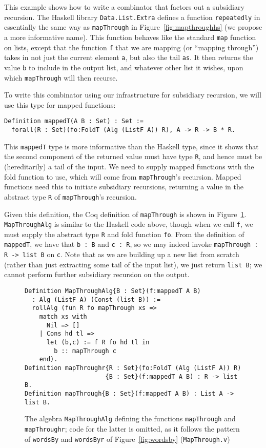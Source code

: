 \documentclass[a4paper,USenglish]{lipics-v2021}
\begin{document}
This example shows how to write a combinator that factors out a
subsidiary recursion.  The Haskell library \verb|Data.List.Extra|
defines a function \verb|repeatedly| in essentially the same way as
\verb|mapThrough| in Figure~\ref{fig:mapthroughhs} (we propose a more
informative name).  This function behaves like the standard \verb|map|
function on lists, except that the function \verb|f| that we are
mapping (or ``mapping through'') takes in not just the current element
\verb|a|, but also the tail \verb|as|.  It then returns the value
\verb|b| to include in the output list, and whatever other list it
wishes, upon which \verb|mapThrough| will then recurse.

To write this combinator using our infrastructure for subsidiary
recursion, we will use this type for mapped functions:
\begin{verbatim}
Definition mappedT(A B : Set) : Set :=
  forall(R : Set)(fo:FoldT (Alg (ListF A)) R), A -> R -> B * R.
\end{verbatim}
\noindent This \verb|mappedT| type is more informative than the
Haskell type, since it shows that the second component of the returned
value must have type \verb|R|, and hence must be (hereditarily) a tail
of the input.  We need to supply mapped functions with the fold
function to use, which will come from \verb|mapThrough|'s recursion.
Mapped functions need this to initiate subsidiary recursions,
returning a value in the abstract type \verb|R| of \verb|mapThrough|'s
recursion.

Given this definition, the Coq definition of \verb|mapThrough| is shown in Figure~\ref{fig:mapthrough}.  
\verb|MapThroughAlg| is similar to the
Haskell code above, though when we call \verb|f|, we must
supply the abstract type \verb|R| and fold function \verb|fo|.  
From the definition of \verb|mappedT|, we have that \verb|b : B| and
\verb|c : R|, so we may indeed invoke \verb|mapThrough : R -> list B|
on \verb|c|.  Note that as we are building up a new list from scratch
(rather than just extracting some tail of the input list), we just
return \verb|list B|; we cannot perform further subsidiary recursion
on the output.  

\begin{figure}
\begin{verbatim}
Definition MapThroughAlg{B : Set}(f:mappedT A B)
  : Alg (ListF A) (Const (list B)) :=
  rollAlg (fun R fo mapThrough xs => 
    match xs with
      Nil => []
    | Cons hd tl =>
      let (b,c) := f R fo hd tl in
        b :: mapThrough c
    end).
Definition mapThroughr{R : Set}(fo:FoldT (Alg (ListF A)) R)
                      {B : Set}(f:mappedT A B) : R -> list B.
Definition mapThrough{B : Set}(f:mappedT A B) : List A -> list B.
\end{verbatim}
\caption{The algebra \texttt{MapThroughAlg} defining the functions \texttt{mapThrough} and \texttt{mapThroughr}; 
  code for the latter is omitted, as it follows the pattern of \texttt{wordsBy} and \texttt{wordsByr} of Figure~\ref{fig:wordsby} (\texttt{MapThrough.v})}
\label{fig:mapthrough}
\end{figure}
\end{document}
